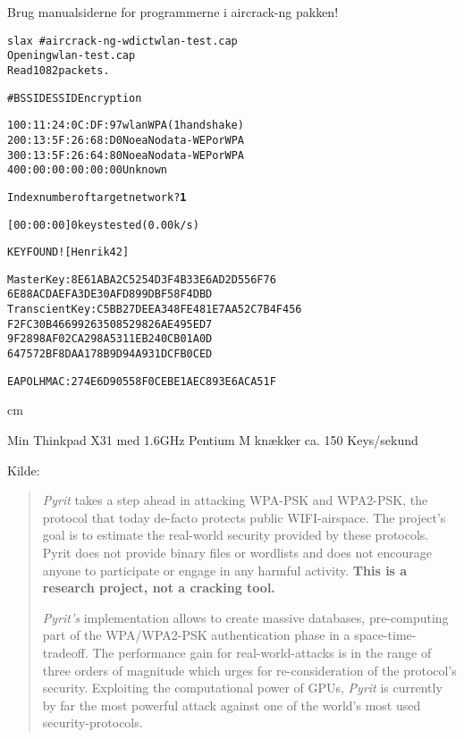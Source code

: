 \centerline{Brug manualsiderne for programmerne i aircrack-ng pakken!}


\begin{alltt}
\small
slax ~ # aircrack-ng -w dict wlan-test.cap
Opening wlan-test.cap
Read 1082 packets.

#  BSSID              ESSID           Encryption

1  00:11:24:0C:DF:97  wlan            WPA (1 handshake)
2  00:13:5F:26:68:D0  Noea            No data - WEP or WPA
3  00:13:5F:26:64:80  Noea            No data - WEP or WPA
4  00:00:00:00:00:00                  Unknown

Index number of target network ? {\bf 1}
\end{alltt}


\begin{alltt}
\small
          [00:00:00] 0 keys tested (0.00 k/s)

                    KEY FOUND! [ Henrik42 ]

Master Key     : 8E 61 AB A2 C5 25 4D 3F 4B 33 E6 AD 2D 55 6F 76
                 6E 88 AC DA EF A3 DE 30 AF D8 99 DB F5 8F 4D BD
Transcient Key : C5 BB 27 DE EA 34 8F E4 81 E7 AA 52 C7 B4 F4 56
                 F2 FC 30 B4 66 99 26 35 08 52 98 26 AE 49 5E D7
                 9F 28 98 AF 02 CA 29 8A 53 11 EB 24 0C B0 1A 0D
                 64 75 72 BF 8D AA 17 8B 9D 94 A9 31 DC FB 0C ED

EAPOL HMAC     : 27 4E 6D 90 55 8F 0C EB E1 AE C8 93 E6 AC A5 1F

\end{alltt}

 cm

\centerline{Min Thinkpad X31 med 1.6GHz Pentium M knækker ca. 150 Keys/sekund}



Kilde: 


\begin{quote}
\emph{Pyrit} takes a step ahead in attacking WPA-PSK and WPA2-PSK, the protocol that today de-facto protects public WIFI-airspace. The project's goal is to estimate the real-world security provided by these protocols. Pyrit does not provide binary files or wordlists and does not encourage anyone to participate or engage in any harmful activity. {\bf This is a research project, not a cracking tool.}

\emph{Pyrit's} implementation allows to create massive databases, pre-computing part of the WPA/WPA2-PSK authentication phase in a space-time-tradeoff. The performance gain for real-world-attacks is in the range of three orders of magnitude which urges for re-consideration of the protocol's security. Exploiting the computational power of GPUs, \emph{Pyrit} is currently by far the most powerful attack against one of the world's most used security-protocols. 
\end{quote}


